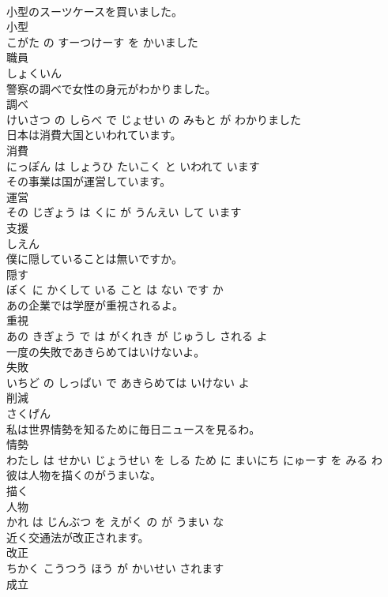 \documentclass[8pt]{extreport}
\begin{document}
\begin{CJK}{UTF8}{min}
\\	小型のスーツケースを買いました。	
\\	小型 
\\	こがた の すーつけーす を かいました			
\\	職員	
\\	しょくいん			
\\	警察の調べで女性の身元がわかりました。	
\\	調べ 
\\	けいさつ の しらべ で じょせい の みもと が わかりました			
\\	日本は消費大国といわれています。	
\\	消費 
\\	にっぽん は しょうひ たいこく と いわれて います			
\\	その事業は国が運営しています。	
\\	運営 
\\	その じぎょう は くに が うんえい して います			
\\	支援	
\\	しえん			
\\	僕に隠していることは無いですか。	
\\	隠す 
\\	ぼく に かくして いる こと は ない です か			
\\	あの企業では学歴が重視されるよ。	
\\	重視 
\\	あの きぎょう で は がくれき が じゅうし される よ			
\\	一度の失敗であきらめてはいけないよ。	
\\	失敗 
\\	いちど の しっぱい で あきらめては いけない よ			
\\	削減	
\\	さくげん			
\\	私は世界情勢を知るために毎日ニュースを見るわ。	
\\	情勢 
\\	わたし は せかい じょうせい を しる ため に まいにち にゅーす を みる わ			
\\	彼は人物を描くのがうまいな。	
\\	描く 
\\	人物 
\\	かれ は じんぶつ を えがく の が うまい な			
\\	近く交通法が改正されます。	
\\	改正 
\\	ちかく こうつう ほう が かいせい されます			
\\	成立	

\end{CJK}
\end{document}
